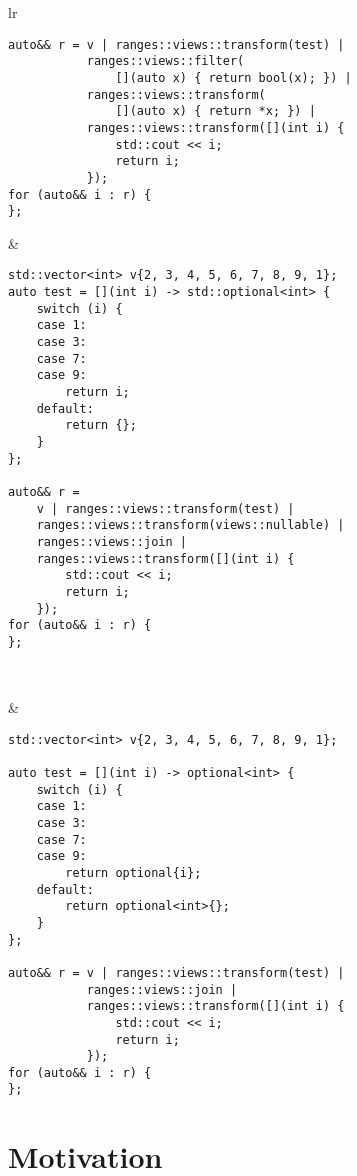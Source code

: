 \documentclass[a4paper,10pt,oneside,openany,final,article]{memoir}
\begin{document}
\begin{tabular}{ lr }
\begin{minipage}[t]{0.45\columnwidth}
\begin{verbatim}
auto&& r = v | ranges::views::transform(test) |
           ranges::views::filter(
               [](auto x) { return bool(x); }) |
           ranges::views::transform(
               [](auto x) { return *x; }) |
           ranges::views::transform([](int i) {
               std::cout << i;
               return i;
           });
for (auto&& i : r) {
};

\end{verbatim}
\end{minipage}
&
\begin{minipage}[t]{0.45\columnwidth}
\begin{verbatim}
std::vector<int> v{2, 3, 4, 5, 6, 7, 8, 9, 1};
auto test = [](int i) -> std::optional<int> {
    switch (i) {
    case 1:
    case 3:
    case 7:
    case 9:
        return i;
    default:
        return {};
    }
};

auto&& r =
    v | ranges::views::transform(test) |
    ranges::views::transform(views::nullable) |
    ranges::views::join |
    ranges::views::transform([](int i) {
        std::cout << i;
        return i;
    });
for (auto&& i : r) {
};

\end{verbatim}
\end{minipage}
  \\ \midrule
\begin{minipage}[t]{0.45\columnwidth}
\end{minipage}
&
\begin{minipage}[t]{0.45\columnwidth}
\begin{verbatim}
std::vector<int> v{2, 3, 4, 5, 6, 7, 8, 9, 1};

auto test = [](int i) -> optional<int> {
    switch (i) {
    case 1:
    case 3:
    case 7:
    case 9:
        return optional{i};
    default:
        return optional<int>{};
    }
};

auto&& r = v | ranges::views::transform(test) |
           ranges::views::join |
           ranges::views::transform([](int i) {
               std::cout << i;
               return i;
           });
for (auto&& i : r) {
};
\end{verbatim}
\end{minipage}

\end{tabular}

\chapter{Motivation}
\end{document}
